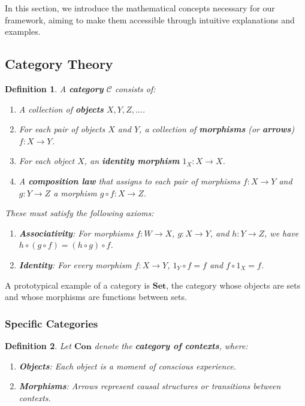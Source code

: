 \documentclass{article}
\newtheorem{definition}{Definition}[section]
\begin{document}
In this section, we introduce the mathematical concepts necessary for our framework, aiming to make them accessible through intuitive explanations and examples.

\subsection{Category Theory}

\begin{definition}
A \textbf{category} $\mathcal{C}$ consists of:
\begin{enumerate}[label=(\alph*)]
    \item A collection of \textbf{objects} $X, Y, Z, \dots$.
    \item For each pair of objects $X$ and $Y$, a collection of \textbf{morphisms} (or \textbf{arrows}) $f \colon X \to Y$.
    \item For each object $X$, an \textbf{identity morphism} $1_X \colon X \to X$.
    \item A \textbf{composition law} that assigns to each pair of morphisms $f \colon X \to Y$ and $g \colon Y \to Z$ a morphism $g \circ f \colon X \to Z$.
\end{enumerate}
These must satisfy the following axioms:
\begin{enumerate}
    \item \textbf{Associativity}: For morphisms $f \colon W \to X$, $g \colon X \to Y$, and $h \colon Y \to Z$, we have $h \circ (g \circ f) = (h \circ g) \circ f$.
    \item \textbf{Identity}: For every morphism $f \colon X \to Y$, $1_Y \circ f = f$ and $f \circ 1_X = f$.
\end{enumerate}
\end{definition}

A prototypical example of a category is $\mathbf{Set}$, the category whose objects are sets and whose morphisms are functions between sets.

\subsubsection{Specific Categories}

\begin{definition}
Let $\mathbf{Con}$ denote the \textbf{category of contexts}, where:
\begin{enumerate}
    \item \textbf{Objects}: Each object is a moment of conscious experience.
    \item \textbf{Morphisms}: Arrows represent causal structures or transitions between contexts.
\end{enumerate}
\end{definition}
\end{document}
